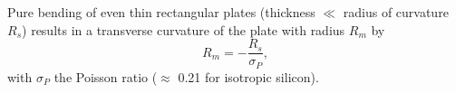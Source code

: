 Pure bending of even thin rectangular plates (thickness $\ll$ radius of curvature $R_s$) results in a transverse curvature of the plate with radius $R_m$ by \cite{Sparks1982}
\begin{equation}
    R_m = -\frac{R_s}{\sigma_P},
\end{equation}
with $\sigma_P$ the Poisson ratio ($\approx$ 0.21 for isotropic silicon).







